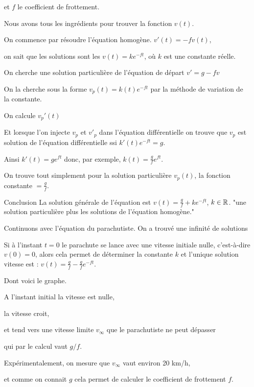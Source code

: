 \change
et $f$ le coefficient de frottement.

\change
Nous avons tous les ingrédients pour trouver la fonction $v(t)$.

\change
On commence  par résoudre l'équation homogène.
$v'(t)=-fv(t)$,

\change
on sait que les solutions sont les $v(t)= ke^{-ft}$, 
où $k$ est une constante réelle.

\change
On cherche une solution particulière 
de l'équation de départ $v'= g - f v$

\change
On la cherche sous la forme $v_p(t)=k(t)e^{-ft}$
   par la méthode de variation de la constante. 
   
 \change
 On calcule $v_p'(t)$
 
 \change
 Et lorsque l'on injecte $v_p$ et $v'_p$ dans l'équation différentielle
 on trouve que $v_p$ est solution de l'équation différentielle 
  ssi   $k'(t)e^{-ft}=g$. 
  
  
  \change
  Ainsi $k'(t)=ge^{ft}$ donc, par exemple, $k(t)=\frac{g}{f}e^{ft}$.
  
  \change
  On trouve tout simplement pour la solution particulière $v_p(t)$, la fonction constante 
  $=\frac{g}{f}$.
  
  
  \change
  Conclusion 
  La solution générale de l'équation est 
  $v(t)=\frac{g}{f}+k e^{-ft}$, $k\in\mathbb{R}$.
  "une solution particulière plus les solutions de l'équation homogène."

\diapo

Continuons avec l'équation du parachutiste.
On a trouvé une infinité de solutions

\change
  Si à l'instant $t=0$ le parachute se lance 
  avec une vitesse initiale nulle, c'est-à-dire
  $v(0)=0$, alors cela permet de déterminer la constante $k$ et
  l'unique solution  vitesse est :
  $v(t)=\frac{g}{f}-\frac{g}{f}e^{-ft}.$
  
\change
Dont voici le graphe.

A l'instant initial la vitesse est nulle, 

la vitesse croit,

\change
et tend vers une vitesse limite $v_\infty$
que le parachutiste ne peut dépasser


\change
qui par le calcul vaut $g/f$.

\change
  Expérimentalement, on mesure que $v_\infty$ 
  vaut environ 20 km/h,
  
  et comme on connait $g$  cela permet de calculer 
  le coefficient de frottement $f$.
  
